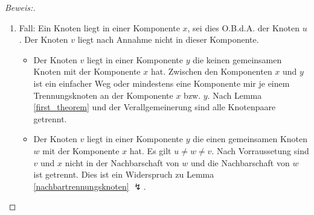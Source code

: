 \begin{proof}[Beweis:]
\begin{enumerate}
\begin{itemize}
\end{itemize}  
\item Fall: Ein Knoten liegt in einer Komponente $x$, sei dies O.B.d.A. der Knoten $u$. Der Knoten $v$ liegt nach Annahme nicht in dieser Komponente. 
\begin{itemize}
\item Der Knoten $v$ liegt in einer Komponente $y$ die keinen gemeinsamen Knoten mit der Komponente $x$ hat. Zwischen den Komponenten $x$ und $y$ ist ein einfacher Weg oder mindestens eine Komponente mir je einem Trennungsknoten an der Komponente $x$ bzw. $y$. Nach Lemma \ref{first_theorem} und der Verallgemeinerung sind alle Knotenpaare getrennt.
\item Der Knoten $v$ liegt in einer Komponente $y$ die einen gemeinsamen Knoten $w$ mit der Komponente $x$ hat. Es gilt $u \neq w \neq v$. Nach Vorraussetung sind $v$ und $x$ nicht in der Nachbarschaft von $w$ und die Nachbarschaft von $w$ ist getrennt. Dies ist ein Widerspruch zu Lemma \ref{nachbartrennungsknoten} $\lightning$.
\end{itemize}  
\end{enumerate}
\end{proof}

\vspace{-10mm}
